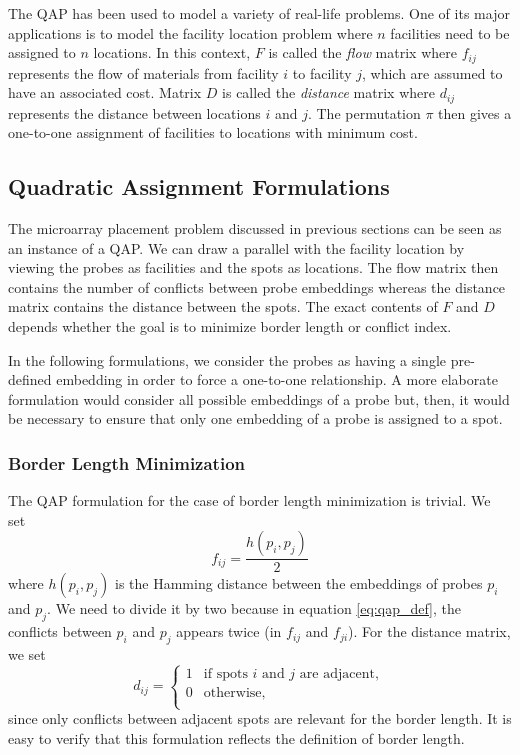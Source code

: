 \documentclass{bioinfo}
\begin{document}
The QAP has been used to model a variety of real-life problems. One of its major applications is to model the facility location problem where $n$ facilities need to be assigned to $n$ locations. In this context, $F$ is called the \emph{flow} matrix where $f_{ij}$ represents the flow of materials from facility $i$ to facility $j$, which are assumed to have an associated cost. Matrix $D$ is called the \emph{distance} matrix where $d_{ij}$ represents the distance between locations $i$ and $j$. The permutation $\pi$ then gives a one-to-one assignment of facilities to locations with minimum cost.

\subsection{Quadratic Assignment Formulations}
\label{sec:qap_form}

The microarray placement problem discussed in previous sections can be seen as an instance of a QAP. We can draw a parallel with the facility location by viewing the probes as facilities and the spots as locations. The flow matrix then contains the number of conflicts between probe embeddings whereas the distance matrix contains the distance between the spots. The exact contents of $F$ and $D$ depends whether the goal is to minimize border length or conflict index.

In the following formulations, we consider the probes as having a single pre-defined embedding in order to force a one-to-one relationship. A more elaborate formulation would consider all possible embeddings of a probe but, then, it would be necessary to ensure that only one embedding of a probe is assigned to a spot.

\subsubsection{Border Length Minimization}

The QAP formulation for the case of border length minimization is trivial. We set
\begin{equation}
f_{ij} = \frac{h(p_i, p_j)}{2}
\end{equation}
where $h(p_i, p_j)$ is the Hamming distance between the embeddings of probes $p_i$ and $p_j$. We need to divide it by two because in equation \ref{eq:qap_def}, the conflicts between $p_i$ and $p_j$ appears twice (in $f_{ij}$ and $f_{ji}$). For the distance matrix, we set
\begin{equation}
d_{ij} =
	\left\{
		\begin{array}{ll}
			1 & \mbox{if spots $i$ and $j$ are adjacent}, \\
			0 & \mbox{otherwise}, \\
		\end{array}
	\right.
\end{equation}
since only conflicts between adjacent spots are relevant for the border length. It is easy to verify that this formulation reflects the definition of border length.
\end{document}
